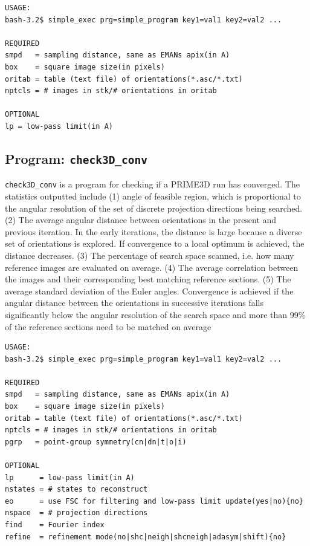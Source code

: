 \documentclass[a4paper,11pt]{article}
\newcommand{\prgname}[1]{\textcolor{NavyBlue}{\texttt{#1}}}
\begin{document}
\begin{verbatim}
USAGE:
bash-3.2$ simple_exec prg=simple_program key1=val1 key2=val2 ...

REQUIRED
smpd   = sampling distance, same as EMANs apix(in A)
box    = square image size(in pixels)
oritab = table (text file) of orientations(*.asc/*.txt)
nptcls = # images in stk/# orientations in oritab

OPTIONAL
lp = low-pass limit(in A)
\end{verbatim}

\subsection{Program: \prgname{check3D\_conv}}
\label{check3D_conv}
\prgname{check3D\_conv} is a program for checking if a PRIME3D run has converged. The statistics outputted include (1) angle of feasible region, which is proportional to the angular resolution of the set of discrete projection directions being searched. (2) The average angular distance between orientations in the present and previous iteration. In the early iterations, the distance is large because a diverse set of orientations is explored. If convergence to a local optimum is achieved, the distance decreases. (3) The percentage of search space scanned, i.e. how many reference images are evaluated on average. (4) The average correlation between the images and their corresponding best matching reference sections. (5) The average standard deviation of the Euler angles. Convergence is achieved if the angular distance between the orientations in successive iterations falls significantly below the angular resolution of the search space and more than 99\% of the reference sections need to be matched on average 

\begin{verbatim}
USAGE:
bash-3.2$ simple_exec prg=simple_program key1=val1 key2=val2 ...

REQUIRED
smpd   = sampling distance, same as EMANs apix(in A)
box    = square image size(in pixels)
oritab = table (text file) of orientations(*.asc/*.txt)
nptcls = # images in stk/# orientations in oritab
pgrp   = point-group symmetry(cn|dn|t|o|i)

OPTIONAL
lp      = low-pass limit(in A)
nstates = # states to reconstruct
eo      = use FSC for filtering and low-pass limit update(yes|no){no}
nspace  = # projection directions
find    = Fourier index
refine  = refinement mode(no|shc|neigh|shcneigh|adasym|shift){no}
\end{verbatim}
\end{document}
